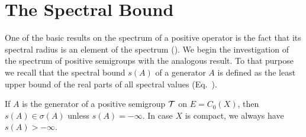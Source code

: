\section{The Spectral Bound}\label{sec:b3-1}%
One of the basic results on the spectrum of a positive operator is the fact that its spectral radius is an element of the spectrum (\textcite[V, Proposition~4.1]{schaefer:1974}).
We begin the investigation of the spectrum of positive semigroups with the analogous result.
To that purpose we recall that the spectral bound $s(A)$ of a generator $A$ is defined as the least upper bound of the real parts of all spectral values (\cf Eq.~).
%
\begin{theorem}\label{thm:b3-1.1}%
If\/ $A$ is the generator of a positive semigroup $\mathcal{T}$ on $E = C_{0}(X)$, then $s(A) \in \sigma(A)$ unless 
$s(A) = -\infty$.
In case $X$ is compact, we always have $s(A) > -\infty$.
\end{theorem}
\vfill
